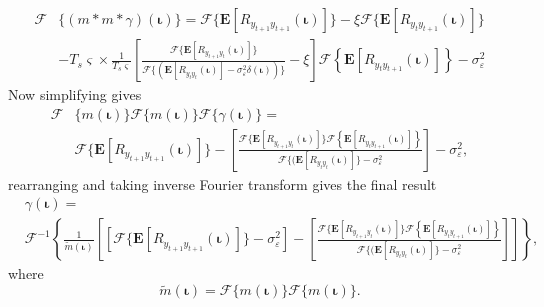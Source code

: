 \documentclass[]{article}
\begin{document}
\begin{align}
	\mathcal{F}&\{(m\ast m \ast \gamma)(\boldsymbol\iota)\} = \mathcal{F}\{\mathbf{E}[R_{y_{t+1}y_{t+1}}(\boldsymbol{\iota})]\}-\xi \mathcal{F}\{\mathbf{E}[R_{y_ty_{t+1}}(\boldsymbol{\iota})]\}\nonumber \\ 
	&- T_s\varsigma \times \frac{1}{T_s\varsigma }\left[\frac{\mathcal{F}\{\mathbf{E}[R_{y_{t+1}y_t}(\boldsymbol{\iota})]\}}{\mathcal{F}\{(\mathbf{E}\left[R_{y_ty_t}(\boldsymbol\iota)\right] - \sigma_{\varepsilon}^2 \delta(\boldsymbol\iota))\}}-\xi\right]\mathcal{F}\left\{\mathbf{E}\left[R_{y_ty_{t+1}}(\boldsymbol\iota)\right] \right\} -\sigma_{\varepsilon}^2\label{eq:EM=mmgamma}
\end{align}
Now simplifying gives
\begin{align}\label{eq:EM-MMGFourier1}
	\mathcal{F}&\{m(\boldsymbol\iota)\}\mathcal{F}\{m(\boldsymbol\iota)\}\mathcal{F}\{\gamma(\boldsymbol\iota)\} = \nonumber \\
&\mathcal{F}\{\mathbf{E}[R_{y_{t+1}y_{t+1}}(\boldsymbol{\iota})]\}- \left[\frac{\mathcal{F}\{\mathbf{E}[R_{y_{t+1}y_t}(\boldsymbol{\iota})]\}\mathcal{F}\left\{\mathbf{E}\left[R_{y_ty_{t+1}}(\boldsymbol\iota)\right] \right\}}{\mathcal{F}\{(\mathbf{E}\left[R_{y_ty_t}(\boldsymbol\iota)\right]\} - \sigma_{\varepsilon}^2}\right]-\sigma_{\varepsilon}^2 ,
\end{align}
rearranging and taking inverse Fourier transform gives the final result
\begin{align}\label{eq:EM-MMGFourier2}
	&\gamma(\boldsymbol\iota) = \nonumber \\
&\mathcal{F}^{-1}\left\lbrace \frac{1}{\tilde{m}(\boldsymbol\iota)}\left[\left[\mathcal{F}\{\mathbf{E}[R_{y_{t+1}y_{t+1}}(\boldsymbol{\iota})]\}-\sigma_{\varepsilon}^2\right]- \left[\frac{\mathcal{F}\{\mathbf{E}[R_{y_{t+1}y_t}(\boldsymbol{\iota})]\}\mathcal{F}\left\{\mathbf{E}\left[R_{y_ty_{t+1}}(\boldsymbol\iota)\right] \right\}}{\mathcal{F}\{(\mathbf{E}\left[R_{y_ty_t}(\boldsymbol\iota)\right]\} - \sigma_{\varepsilon}^2}\right]\right]\right\rbrace  ,
\end{align}
where
\begin{equation}
 \tilde{m}(\boldsymbol\iota)=\mathcal{F}\{m(\boldsymbol\iota)\}\mathcal{F}\{m(\boldsymbol\iota)\}.
\end{equation}
\end{document}
